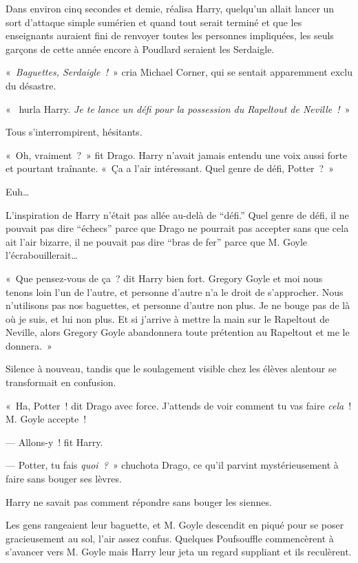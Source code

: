 Dans environ cinq secondes et demie, réalisa Harry, quelqu'un allait lancer un sort d'attaque simple sumérien et quand tout serait terminé et que les enseignants auraient fini de renvoyer toutes les personnes impliquées, les seuls garçons de cette année encore à Poudlard seraient les Serdaigle.

«~\emph{Baguettes, Serdaigle~!}~» cria Michael Corner, qui se sentait apparemment exclu du désastre.

«~ hurla Harry.
\emph{Je te lance un défi pour la possession du Rapeltout de Neville~!}~»

Tous s'interrompirent, hésitants.

«~Oh, vraiment~?~»
fit Drago.
Harry n'avait jamais entendu une voix aussi forte et pourtant traînante.
«~Ça a l'air intéressant.
Quel genre de défi, Potter~?~»

Euh…

L'inspiration de Harry n'était pas allée au-delà de “défi.”
Quel genre de défi, il ne pouvait pas dire “échecs” parce que Drago ne pourrait pas accepter sans que cela ait l'air bizarre, il ne pouvait pas dire “bras de fer” parce que M. Goyle l'écrabouillerait…

«~Que pensez-vous de ça~? dit Harry bien fort.
Gregory Goyle et moi nous tenons loin l'un de l'autre, et personne d'autre n'a le droit de s'approcher.
Nous n'utilisons pas nos baguettes, et personne d'autre non plus.
Je ne bouge pas de là où je suis, et lui non plus.
Et si j'arrive à mettre la main sur le Rapeltout de Neville, alors Gregory Goyle abandonnera toute prétention au Rapeltout et me le donnera.~»

Silence à nouveau, tandis que le soulagement visible chez les élèves alentour se transformait en confusion.

«~Ha, Potter~! dit Drago avec force.
J'attends de voir comment tu vas faire \emph{cela}~!
M. Goyle accepte~!

--- Allons-y~! fit Harry.

--- Potter, tu fais \emph{quoi~?}~» chuchota Drago, ce qu'il parvint mystérieusement à faire sans bouger ses lèvres.

Harry ne savait pas comment répondre sans bouger les siennes.

Les gens rangeaient leur baguette, et M. Goyle descendit en piqué pour se poser gracieusement au sol, l'air assez confus.
Quelques Poufsouffle commencèrent à s'avancer vers M. Goyle mais Harry leur jeta un regard suppliant et ils reculèrent.

